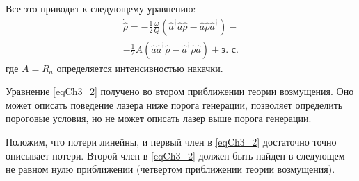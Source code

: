 Все это приводит к следующему уравнению:
\begin{eqnarray}
\dot{\hat{\rho}} =
- \frac{1}{2}\frac{\omega}{Q}
\left(\hat{a}^{\dag}\hat{a}\hat{\rho} - 
\hat{a}\hat{\rho}\hat{a}^{\dag}
\right)
-
\nonumber \\
- \frac{1}{2}A
\left(\hat{a}\hat{a}^{\dag}\hat{\rho} - 
\hat{a}^{\dag}\hat{\rho}\hat{a}
\right)
 + \mbox{э. с.}
\label{eqCh3_2}
\end{eqnarray}
где $A = R_a$ определяется интенсивностью накачки.

Уравнение \eqref{eqCh3_2} получено во втором приближении теории
возмущения. Оно может описать поведение лазера ниже
порога генерации, позволяет определить пороговые условия, но не может
описать лазер выше порога генерации.  

Положим, что потери линейны, и первый член в \eqref{eqCh3_2}
достаточно точно описывает потери. Второй член в \eqref{eqCh3_2} должен быть
найден в следующем не равном нулю приближении (четвертом приближении
теории возмущения).
 
